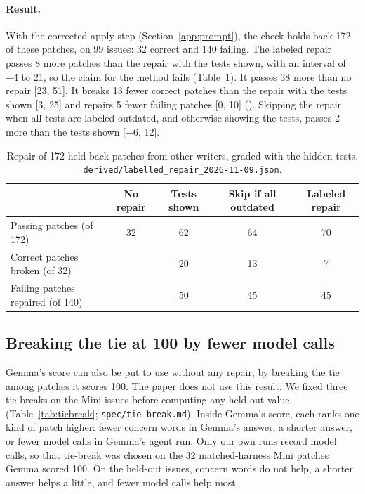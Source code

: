 \documentclass[10pt,letterpaper]{article}
\begin{document}
\paragraph{Result.} With the corrected apply step (Section~\ref{app:prompt}), the check holds back 172 of these patches, on
99 issues: 32 correct and 140 failing. The labeled repair passes 8 more patches than the repair with the tests shown, with an
interval of $-4$ to 21, so the claim for the method fails (Table~\ref{tab:labeled}). It passes 38 more than no repair
[23, 51]. It breaks 13 fewer correct patches than the repair with the tests shown [3, 25] and repairs 5 fewer failing
patches [0, 10] (). Skipping the repair when all tests are labeled outdated, and otherwise showing the tests, passes 2 more
than the tests shown [$-6$, 12].

\begin{table}[H]
\centering
\small
\caption{Repair of 172 held-back patches from other writers, graded with the hidden tests.
\texttt{derived/labelled\_repair\_2026-11-09.json}.}
\label{tab:labeled}
\begin{tabular}{@{}lcccc@{}}
\toprule
 & No repair & Tests shown & Skip if all outdated & Labeled repair \\
\midrule
Passing patches (of 172) & 32 & 62 & 64 & 70 \\
Correct patches broken (of 32) & & 20 & 13 & 7 \\
Failing patches repaired (of 140) & & 50 & 45 & 45 \\
\bottomrule
\end{tabular}
\end{table}

\subsection*{Breaking the tie at 100 by fewer model calls}

Gemma's score can also be put to use without any repair, by breaking the tie among patches it scores 100. The paper
does not use this result. We fixed three
tie-breaks on the Mini issues before computing any held-out value (Table~\ref{tab:tiebreak}; \texttt{spec/tie-break.md}).
Inside Gemma's score, each ranks one kind of patch higher: fewer concern words in Gemma's answer, a shorter answer, or
fewer model calls in Gemma's agent run. Only our own runs record model calls, so that tie-break was chosen on the 32
matched-harness Mini patches Gemma scored 100. On the held-out issues, concern words do not help, a shorter answer
helps a little, and fewer model calls help most.
\end{document}
